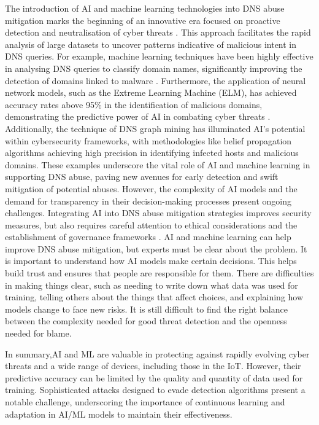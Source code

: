 The introduction of AI and machine learning technologies into DNS abuse mitigation marks the beginning of an innovative era focused on proactive detection and neutralisation of cyber threats \cite{tariq2023critical}.  This approach facilitates the rapid analysis of large datasets to uncover patterns indicative of malicious intent in DNS queries. For example, machine learning techniques have been highly effective in analysing DNS queries to classify domain names, significantly improving the detection of domains linked to malware \cite{LiMaliciousDomainDetection2020}. Furthermore, the application of neural network models, such as the Extreme Learning Machine (ELM), has achieved accuracy rates above 95\% in the identification of malicious domains, demonstrating the predictive power of AI in combating cyber threats \cite{ZouDNSGraphMining2015}. Additionally, the technique of DNS graph mining has illuminated AI's potential within cybersecurity frameworks, with methodologies like belief propagation algorithms achieving high precision in identifying infected hosts and malicious domains. These examples underscore the vital role of AI and machine learning in supporting DNS abuse, paving new avenues for early detection and swift mitigation of potential abuses. However, the complexity of AI models and the demand for transparency in their decision-making processes present ongoing challenges. Integrating AI into DNS abuse mitigation strategies improves security measures, but also requires careful attention to ethical considerations and the establishment of governance frameworks \cite{AntonakakisMalwareDomainsUpperDNS2011}. AI and machine learning can help improve DNS abuse mitigation, but experts must be clear about the problem.  It is important to understand how AI models make certain decisions. This helps build trust and ensures that people are responsible for them. There are difficulties in making things clear, such as needing to write down what data was used for training, telling others about the things that affect choices, and explaining how models change to face new risks. It is still difficult to find the right balance between the complexity needed for good threat detection and the openness needed for blame.

In summary,AI and ML are valuable in protecting against rapidly evolving cyber threats and a wide range of devices, including those in the IoT. However, their predictive accuracy can be limited by the quality and quantity of data used for training. Sophisticated attacks designed to evade detection algorithms present a notable challenge, underscoring the importance of continuous learning and adaptation in AI/ML models to maintain their effectiveness.


